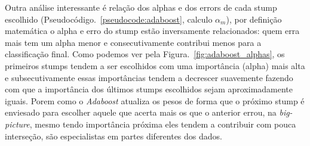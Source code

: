 Outra análise interessante é relação dos alphas e dos errors de cada stump escolhido (Pseudocódigo.~\ref{pseudocode:adaboost}, calculo $\alpha_m$), por definição matemática o alpha  e erro do stump estão inversamente relacionados: quem erra mais tem um alpha menor e consecutivamente contribui menos para a classificação final. Como podemos ver pela Figura.~\ref{fig:adaboost_alphas}, os primeiros stumps tendem a ser escolhidos com uma importância (alpha) mais alta e subsecutivamente essas importâncias tendem a decrescer suavemente fazendo com que a importância dos últimos stumps escolhidos sejam aproximadamente iguais. Porem como o \emph{Adaboost} atualiza os pesos de forma que o próximo stump é enviesado para escolher aquele que acerta mais os que o anterior errou, na \emph{big-picture}, mesmo tendo importância próxima eles tendem a contribuir com pouca interseção, são especialistas em partes diferentes dos dados.
